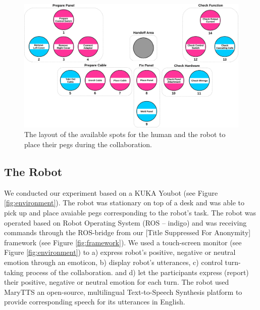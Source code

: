 \documentclass[12pt]{report}
\begin{document}
\begin{figure}[tbh]
  \centering
  \includegraphics[width=1\textwidth]{figure/gameBoard.pdf}
  \caption{The layout of the available spots for the human and the robot to
  place their pegs during the collaboration.}
  \label{fig:game_board}
  \vspace*{-3mm}
\end{figure}

\subsection{The Robot}

We conducted our experiment based on a KUKA Youbot (see Figure
\ref{fig:environment}). The robot was stationary on top of a desk and was able
to pick up and place avaiable pegs corresponding to the robot's task. The robot
was operated based on Robot Operating System (ROS -- indigo) and was receiving
commands through the ROS-bridge from our [Title Suppressed For Anonymity]
framework (see Figure \ref{fig:framework}). We used a touch-screen monitor (see
Figure \ref{fig:environment}) to a) express robot's positive, negative or
neutral emotion through an emoticon, b) display robot's utterances, c)
control turn-taking process of the collaboration. and d) let the participants
express (report) their positive, negative or neutral emotion for each turn. The
robot used MaryTTS an open-source, multilingual Text-to-Speech Synthesis
platform to provide corresponding speech for its utterances in English.
\end{document}
